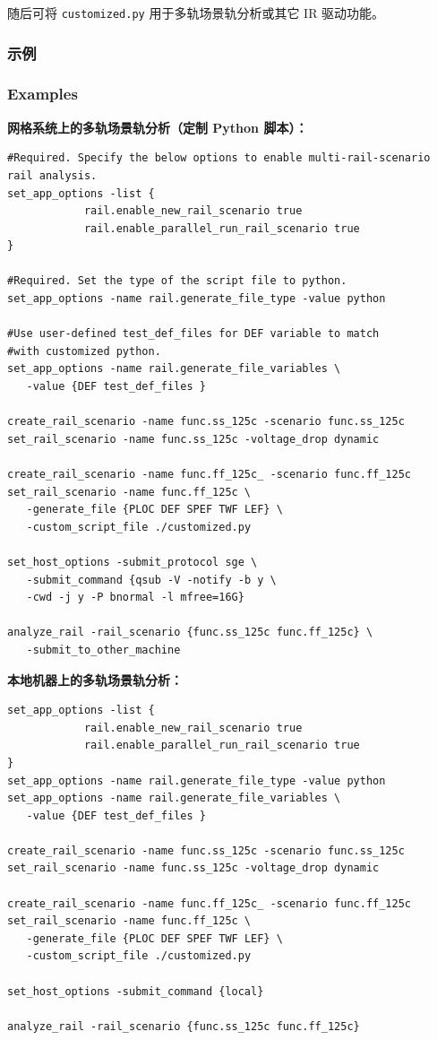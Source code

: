 随后可将 \texttt{customized.py} 用于多轨场景轨分析或其它 IR 驱动功能。

\subsubsection{示例}
\subsubsection*{Examples}

\textbf{网格系统上的多轨场景轨分析（定制 Python 脚本）：}
\begin{lstlisting}
#Required. Specify the below options to enable multi-rail-scenario rail analysis.
set_app_options -list {
            rail.enable_new_rail_scenario true
            rail.enable_parallel_run_rail_scenario true
}

#Required. Set the type of the script file to python.
set_app_options -name rail.generate_file_type -value python

#Use user-defined test_def_files for DEF variable to match
#with customized python.
set_app_options -name rail.generate_file_variables \
   -value {DEF test_def_files }

create_rail_scenario -name func.ss_125c -scenario func.ss_125c
set_rail_scenario -name func.ss_125c -voltage_drop dynamic

create_rail_scenario -name func.ff_125c_ -scenario func.ff_125c
set_rail_scenario -name func.ff_125c \
   -generate_file {PLOC DEF SPEF TWF LEF} \
   -custom_script_file ./customized.py

set_host_options -submit_protocol sge \
   -submit_command {qsub -V -notify -b y \
   -cwd -j y -P bnormal -l mfree=16G}

analyze_rail -rail_scenario {func.ss_125c func.ff_125c} \
   -submit_to_other_machine
\end{lstlisting}

\textbf{本地机器上的多轨场景轨分析：}
\begin{lstlisting}
set_app_options -list {
            rail.enable_new_rail_scenario true
            rail.enable_parallel_run_rail_scenario true
}
set_app_options -name rail.generate_file_type -value python
set_app_options -name rail.generate_file_variables \
   -value {DEF test_def_files }

create_rail_scenario -name func.ss_125c -scenario func.ss_125c
set_rail_scenario -name func.ss_125c -voltage_drop dynamic

create_rail_scenario -name func.ff_125c_ -scenario func.ff_125c
set_rail_scenario -name func.ff_125c \
   -generate_file {PLOC DEF SPEF TWF LEF} \
   -custom_script_file ./customized.py

set_host_options -submit_command {local}

analyze_rail -rail_scenario {func.ss_125c func.ff_125c}
\end{lstlisting}

